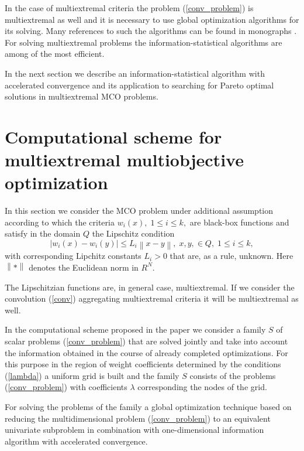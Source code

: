 \documentclass[]{interact}
\theoremstyle{plain}%
\theoremstyle{definition}
\theoremstyle{remark}
\begin{document}
In the case of multiextremal criteria the problem (\ref{conv_problem}) is multiextremal as well and it is necessary to use global optimization algorithms for its solving. Many references to such the algorithms can be found in monographs \cite{Strongin2000,Pinter1996,Zhigljavsky2008,Sergeyev2013,PaulaviciusZilinskas2014,Sergeyev2017}. For solving multiextremal problems the information-statistical algorithms \cite{Strongin2000,Sergeyev2013} are among of the most efficient.

In the next section we describe an information-statistical algorithm with accelerated convergence and its application to searching for Pareto optimal solutions in multiextremal MCO problems.

\section{Computational scheme for multiextremal multiobjective optimization}

In this section we consider the MCO problem under additional assumption according to which the criteria $w_i(x), \; 1 \leq i \leq k,$ are black-box functions and satisfy in the domain $Q$ the Lipschitz condition
\begin{equation}\label{lip}
\left| w_i(x) - w_i(y)\right| \leq L_i \left\| x-y \right\|, \; x,y, \in Q, \; 1 \leq i \leq k,
\end{equation}
with corresponding Lipchitz constants $L_i > 0$ that are, as a rule, unknown. Here $\left\|*\right\|$   denotes the Euclidean norm in $R^N$.

The Lipschitzian functions are, in general case, multiextremal. If we consider the convolution (\ref{conv}) aggregating multiextremal criteria it will be multiextremal as well.

In the computational scheme proposed in the paper we consider a family $S$ of scalar problems (\ref{conv_problem}) that are solved jointly and take into account the information obtained in the course of already completed optimizations. For this purpose in the region of weight coefficients determined by the conditions (\ref{lambda}) a uniform grid is built and the family $S$ consists of the problems (\ref{conv_problem}) with coefficients $\lambda$ corresponding the nodes of the grid.

For solving the problems of the family a global optimization technique based on reducing the multidimensional problem (\ref{conv_problem}) to an equivalent univariate subproblem \cite{Strongin2000,Pinter1996,Zhigljavsky2008,Sergeyev2013,PaulaviciusZilinskas2014,Sergeyev2017} in combination with one-dimensional information algorithm with accelerated convergence.
\end{document}
